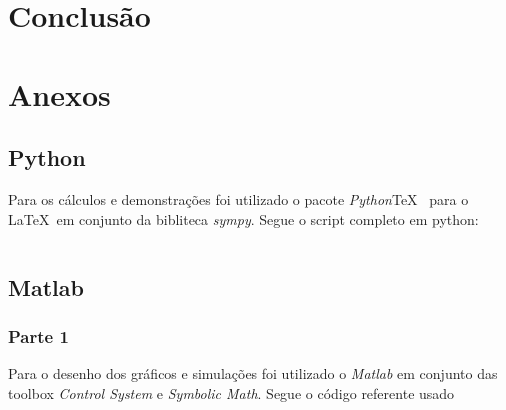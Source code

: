 \documentclass[a4paper,11pt]{article}
\begin{document}
\section{Conclusão}

\newpage

\nocite{sympy}
\nocite{pythontex}
\nocite{matlabcontrol}
\nocite{matlabsymbolic}
\nocite{ogata2010modern}

\newpage
\section*{Anexos}
\subsection*{Python}

Para os cálculos e demonstrações foi utilizado o pacote \textit{Python}\TeX\ \cite{pythontex} para o \LaTeX\ em conjunto da bibliteca \textit{sympy}\cite{sympy}. Segue o script completo em python:

\inputminted[xleftmargin=15pt,linenos,frame=single,framesep=5pt,breaklines=true]{python}{../python/exsim6.py}

\newpage
\subsection*{Matlab}

\subsubsection*{Parte 1}
Para o desenho dos gráficos e simulações foi utilizado o \textit{Matlab} em conjunto das toolbox \textit{Control System}\cite{matlabcontrol} e \textit{Symbolic Math}\cite{matlabsymbolic}. Segue o código referente usado

\inputminted[xleftmargin=15pt,linenos,frame=single,framesep=5pt,breaklines=true]{matlab}{../matlab/exsim6/exsim6.m}


\end{document}
